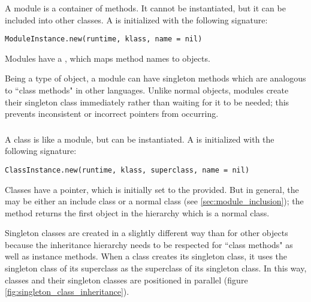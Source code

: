 \subsubsection{}

A module is a container of methods. It cannot be instantiated, but it can be included into other classes. A  is initialized with the following signature:

\begin{lstlisting}
ModuleInstance.new(runtime, klass, name = nil)
\end{lstlisting}

Modules have a , which maps method names to  objects.

Being a type of object, a module can have singleton methods which are analogous to ``class methods" in other languages. Unlike normal objects, modules create their singleton class immediately rather than waiting for it to be needed; this prevents inconsistent or incorrect  pointers from occurring.

\subsubsection{}

A class is like a module, but can be instantiated. A  is initialized with the following signature:

\begin{lstlisting}
ClassInstance.new(runtime, klass, superclass, name = nil)
\end{lstlisting}

Classes have a  pointer, which is initially set to the  provided. But in general, the  may be either an include class or a normal class (see \ref{sec:module_inclusion}); the  method returns the first object in the  hierarchy which is a normal class.

Singleton classes are created in a slightly different way than for other objects because the inheritance hierarchy needs to be respected for ``class methods" as well as instance methods. When a class creates its singleton class, it uses the singleton class of its superclass as the superclass of its singleton class. In this way, classes and their singleton classes are positioned in parallel (figure \ref{fig:singleton_class_inheritance}).

